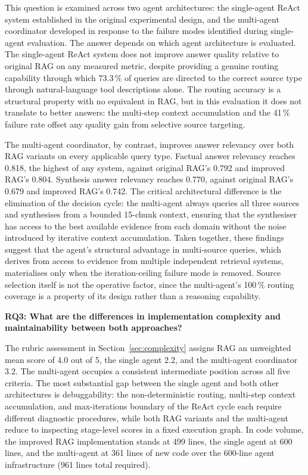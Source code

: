 This question is examined across two agent architectures: the single-agent ReAct system established in the original experimental design, and the multi-agent coordinator developed in response to the failure modes identified during single-agent evaluation. The answer depends on which agent architecture is evaluated. The single-agent ReAct system does not improve answer quality relative to original RAG on any measured metric, despite providing a genuine routing capability through which 73.3\,\% of queries are directed to the correct source type through natural-language tool descriptions alone. The routing accuracy is a structural property with no equivalent in RAG, but in this evaluation it does not translate to better answers: the multi-step context accumulation and the 41\,\% failure rate offset any quality gain from selective source targeting.

The multi-agent coordinator, by contrast, improves answer relevancy over both RAG variants on every applicable query type. Factual answer relevancy reaches 0.818, the highest of any system, against original RAG's 0.792 and improved RAG's 0.804. Synthesis answer relevancy reaches 0.770, against original RAG's 0.679 and improved RAG's 0.742. The critical architectural difference is the elimination of the decision cycle: the multi-agent always queries all three sources and synthesises from a bounded 15-chunk context, ensuring that the synthesiser has access to the best available evidence from each domain without the noise introduced by iterative context accumulation. Taken together, these findings suggest that the agent's structural advantage in multi-source queries, which derives from access to evidence from multiple independent retrieval systems, materialises only when the iteration-ceiling failure mode is removed. Source selection itself is not the operative factor, since the multi-agent's 100\,\% routing coverage is a property of its design rather than a reasoning capability.

\textbf{RQ3: What are the differences in implementation complexity and maintainability between both approaches?}

The rubric assessment in Section~\ref{sec:complexity} assigns RAG an unweighted mean score of 4.0 out of 5, the single agent 2.2, and the multi-agent coordinator 3.2. The multi-agent occupies a consistent intermediate position across all five criteria. The most substantial gap between the single agent and both other architectures is debuggability: the non-deterministic routing, multi-step context accumulation, and max-iterations boundary of the ReAct cycle each require different diagnostic procedures, while both RAG variants and the multi-agent reduce to inspecting stage-level scores in a fixed execution graph. In code volume, the improved RAG implementation stands at 499 lines, the single agent at 600 lines, and the multi-agent at 361 lines of new code over the 600-line agent infrastructure (961 lines total required).

